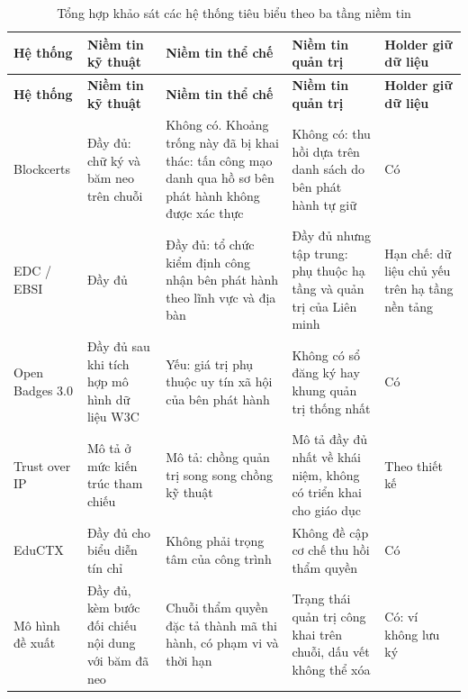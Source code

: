 \begin{longtable}{|p{2.4cm}|p{2.5cm}|p{3.1cm}|p{3.1cm}|p{2.6cm}|}
\caption{Tổng hợp khảo sát các hệ thống tiêu biểu theo ba tầng niềm tin}
\label{tab:trust-layer-survey} \\

\hline
\textbf{Hệ thống} &
\textbf{Niềm tin kỹ thuật} &
\textbf{Niềm tin thể chế} &
\textbf{Niềm tin quản trị} &
\textbf{Holder giữ dữ liệu} \\
\hline
\endfirsthead

\hline
\textbf{Hệ thống} &
\textbf{Niềm tin kỹ thuật} &
\textbf{Niềm tin thể chế} &
\textbf{Niềm tin quản trị} &
\textbf{Holder giữ dữ liệu} \\
\hline
\endhead

\hline
\endfoot

\hline
\endlastfoot

Blockcerts
& Đầy đủ: chữ ký và băm neo trên chuỗi
& Không có. Khoảng trống này đã bị khai thác: tấn công mạo danh qua hồ sơ bên phát hành không được xác thực \cite{Baldi2019}
& Không có: thu hồi dựa trên danh sách do bên phát hành tự giữ
& Có
\\ \hline

EDC / EBSI
& Đầy đủ
& Đầy đủ: tổ chức kiểm định công nhận bên phát hành theo lĩnh vực và địa bàn
& Đầy đủ nhưng tập trung: phụ thuộc hạ tầng và quản trị của Liên minh
& Hạn chế: dữ liệu chủ yếu trên hạ tầng nền tảng
\\ \hline

Open Badges 3.0
& Đầy đủ sau khi tích hợp mô hình dữ liệu W3C
& Yếu: giá trị phụ thuộc uy tín xã hội của bên phát hành
& Không có sổ đăng ký hay khung quản trị thống nhất
& Có
\\ \hline

Trust over IP
& Mô tả ở mức kiến trúc tham chiếu
& Mô tả: chồng quản trị song song chồng kỹ thuật
& Mô tả đầy đủ nhất về khái niệm, không có triển khai cho giáo dục
& Theo thiết kế
\\ \hline

EduCTX
& Đầy đủ cho biểu diễn tín chỉ
& Không phải trọng tâm của công trình
& Không đề cập cơ chế thu hồi thẩm quyền
& Có
\\ \hline

Mô hình đề xuất
& Đầy đủ, kèm bước đối chiếu nội dung với băm đã neo
& Chuỗi thẩm quyền đặc tả thành mã thi hành, có phạm vi và thời hạn
& Trạng thái quản trị công khai trên chuỗi, dấu vết không thể xóa
& Có: ví không lưu ký
\\ \hline

\end{longtable}
